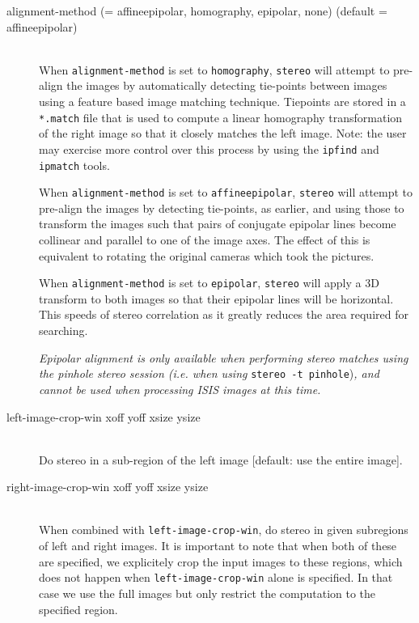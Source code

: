 \begin{description}

\item[alignment-method \textnormal{\small{(= affineepipolar, homography,
      epipolar, none)}} (default = affineepipolar)] \hfill \\

  When \texttt{alignment-method} is set to \texttt{homography},
  \texttt{stereo} will attempt to pre-align the images by
  automatically detecting tie-points between images using a feature
  based image matching technique. Tiepoints are stored in a
  \texttt{*.match} file that is used to compute a linear homography
  transformation of the right image so that it closely matches the
  left image.  Note: the user may exercise more control over this
  process by using the \texttt{ipfind} and \texttt{ipmatch} tools.

  When \texttt{alignment-method} is set to \texttt{affineepipolar},
  \texttt{stereo} will attempt to pre-align the images by detecting
  tie-points, as earlier, and using those to transform the images such
  that pairs of conjugate epipolar lines become collinear and parallel to
  one of the image axes.  The effect of this is equivalent to rotating the
  original cameras which took the pictures.

  When \texttt{alignment-method} is set to \texttt{epipolar},
  \texttt{stereo} will apply a 3D transform to both images so that
  their epipolar lines will be horizontal. This speeds of stereo
  correlation as it greatly reduces the area required for searching.

  {\em Epipolar alignment is only available when performing stereo
    matches using the pinhole stereo session (i.e. when using}
  \texttt{stereo -t pinhole}){\em, and cannot be used when processing
    ISIS images at this time.}

\item[left-image-crop-win \textnormal xoff yoff xsize ysize] \hfill \\
Do stereo in a sub-region of the left image [default: use the entire image].

\item[right-image-crop-win \textnormal xoff yoff xsize ysize] \hfill \\
When combined with \texttt{left-image-crop-win}, do stereo in given subregions
of left and right images. It is important to note that when both of these
are specified, we explicitely crop the input images to these regions,
which does not happen when \texttt{left-image-crop-win} alone is specified.
In that case we use the full images but only restrict the computation
to the specified region.


\end{description}

